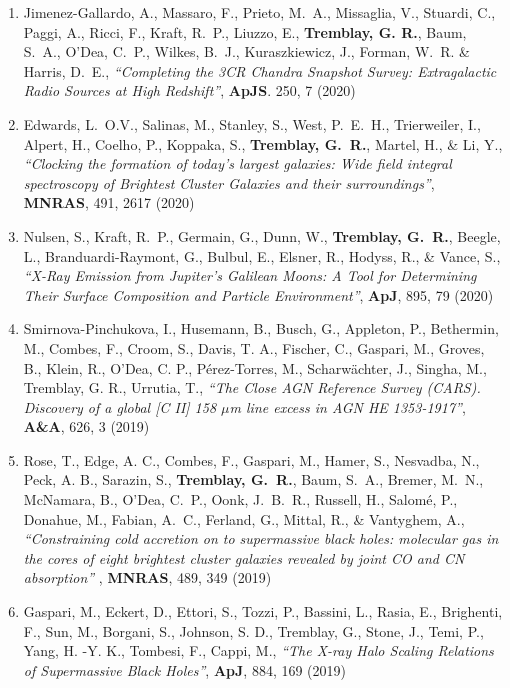 \documentclass[11pt]{article}
\begin{document}
\begin{enumerate}[resume]
\item Jimenez-Gallardo, A., Massaro, F., Prieto, M.~A.,
Missaglia, V., Stuardi, C., Paggi, A., Ricci, F., Kraft, R.~P.,
Liuzzo, E., \textbf{Tremblay, G. R.},
Baum, S.~A., O'Dea, C.~P., Wilkes, B.~J.,
Kuraszkiewicz, J., Forman, W.~R. \& Harris, D.~E., \textit{``Completing the 3CR Chandra Snapshot Survey: Extragalactic Radio Sources at High Redshift''},
\textbf{ApJS}. 250, 7 (2020)



\item Edwards, L.~O.V., Salinas, M., Stanley, S., West, P.~E.~H.,
  Trierweiler, I., Alpert, H., Coelho, P., Koppaka, S., \textbf{Tremblay, G.~R.},
  Martel, H., \& Li, Y., \textit{``Clocking the formation of today's largest galaxies: Wide field integral spectroscopy of Brightest Cluster Galaxies and their surroundings''},
  \textbf{MNRAS}, 491, 2617 (2020)


\item Nulsen, S., Kraft, R.~P., Germain, G., Dunn, W.,
\textbf{Tremblay, G.~R.}, Beegle, L., Branduardi-Raymont, G.,
Bulbul, E., Elsner, R., Hodyss, R., \& Vance, S., \textit{``X-Ray Emission from Jupiter's Galilean Moons: A Tool for Determining Their Surface Composition and Particle Environment''}, \textbf{ApJ}, 895, 79 (2020)

\item Smirnova-Pinchukova, I., Husemann, B.,  Busch, G.,  Appleton, P., Bethermin, M., Combes, F., Croom, S., Davis, T. A., Fischer, C., Gaspari, M., Groves, B., Klein, R., O'Dea, C. P., Pérez-Torres, M., Scharwächter, J., Singha, M., Tremblay, G. R., Urrutia, T.,
\textit{``The Close AGN Reference Survey (CARS). Discovery of a global [C II] 158 $\mu$m line excess in AGN HE 1353-1917''},
\textbf{A\&A}, 626, 3 (2019)

\item Rose, T., Edge, A. C., Combes, F., Gaspari, M.,
Hamer, S., Nesvadba, N., Peck, A. B., Sarazin, S.,
\textbf{Tremblay, G.~R.}, Baum, S.~A., Bremer, M.~N.,
McNamara, B., O'Dea, C.~P., Oonk, J.~B.~R.,
Russell, H., Salom\'{e}, P., Donahue, M., Fabian, A.~C.,
Ferland, G., Mittal, R., \& Vantyghem, A.,
\textit{``Constraining cold accretion on to supermassive black holes: molecular gas in the cores of eight brightest cluster galaxies revealed by joint CO and CN absorption''
}, \textbf{MNRAS}, 489, 349 (2019)

\item Gaspari, M., Eckert, D., Ettori, S., Tozzi, P., Bassini, L., Rasia, E., Brighenti, F., Sun, M., Borgani, S., Johnson, S. D., Tremblay, G., Stone, J., Temi, P., Yang, H. -Y. K., Tombesi, F., Cappi, M., \textit{``The X-ray Halo Scaling Relations of Supermassive Black Holes''}, \textbf{ApJ}, 884, 169 (2019)


\end{enumerate}
\end{document}
